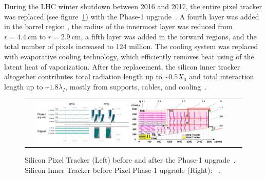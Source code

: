 During the LHC winter shutdown between 2016 and 2017, the entire pixel tracker was replaced (see figure~\ref{Inner_Tracker}) with the Phase-1 upgrade~\cite{Lipinski_2017}.
A fourth layer was added in the barrel region , the radius of the innermost layer was reduced from $r = \SI{4.4}{\cm}$ to $r = \SI{2.9}{\cm}$, a fifth layer was added in the forward regions, and the total number of pixels increased to 124 million.
The cooling system was replaced with evaporative  cooling technology, which efficiently removes heat using of the latent heat of vaporization.
After the replacement, the silicon inner tracker altogether contributes total radiation length up to \sim$0.5 X_0$ and total interaction length up to \sim$1.8 \lambda_I$, mostly from supports, cables, and cooling~\cite{Sirunyan:2270046}.
\begin{figure}[htb]
  \begin{center}
    \begin{tabular}{cc}
        \includegraphics[width=0.45\textwidth]{fig_LHC_CMS/Pixel_Upgrade.png}
        \includegraphics[width=0.45\textwidth]{fig_LHC_CMS/Inner_Tracker.png}
    \end{tabular}
    \caption{Silicon Pixel Tracker (Left) before and after the Phase-1 upgrade~\cite{Adam_2021}.
             Silicon Inner Tracker before Pixel Phase-1 upgrade (Right): ~\cite{Chatrchyan:1211825}.
            }
    \label{Inner_Tracker}
  \end{center}
\end{figure}

